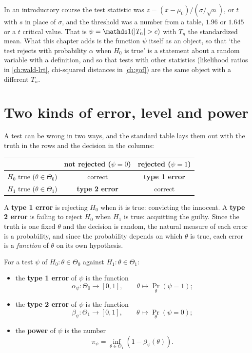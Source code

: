 \begin{bridge}
In an introductory course the test statistic was $z = (\bar{x} - \mu_0)/(\sigma/\sqrt{n})$, or $t$ with $s$ in place of $\sigma$, and the threshold was a number from a table, $1.96$ or $1.645$ or a $t$ critical value.
That is $\psi = \ind(\abs{T_n} > c)$ with $T_n$ the standardized mean.
What this chapter adds is the function $\psi$ itself as an object, so that `the test rejects with probability $\alpha$ when $H_0$ is true' is a statement about a random variable with a definition, and so that tests with other statistics (likelihood ratios in \cref{ch:wald-lrt}, chi-squared distances in \cref{ch:gof}) are the same object with a different $T_n$.
\end{bridge}

\section{Two kinds of error, level and power}
\label{sec:tests-errors}

A test can be wrong in two ways, and the standard table lays them out with the truth in the rows and the decision in the columns:
\begin{center}
\begin{tabular}{@{}lcc@{}}
\toprule
 & not rejected ($\psi = 0$) & rejected ($\psi = 1$) \\
\midrule
$H_0$ true ($\theta \in \Theta_0$) & correct & \textbf{type 1 error} \\
$H_1$ true ($\theta \in \Theta_1$) & \textbf{type 2 error} & correct \\
\bottomrule
\end{tabular}
\end{center}
A \textbf{type 1 error} is rejecting $H_0$ when it is true: convicting the innocent.
A \textbf{type 2 error} is failing to reject $H_0$ when $H_1$ is true: acquitting the guilty.
Since the truth is one fixed $\theta$ and the decision is random, the natural measure of each error is a probability, and since the probability depends on which $\theta$ is true, each error is a \textit{function} of $\theta$ on its own hypothesis.

\begin{definition}
\label{def:errors}
For a test $\psi$ of $H_0: \theta \in \Theta_0$ against $H_1: \theta \in \Theta_1$:
\begin{itemize}[nosep]
\item the \textbf{type 1 error} of $\psi$ is the function
\[
\alpha_\psi: \Theta_0 \to [0, 1], \qquad \theta \mapsto \Pr_\theta(\psi = 1);
\]
\item the \textbf{type 2 error} of $\psi$ is the function
\[
\beta_\psi: \Theta_1 \to [0, 1], \qquad \theta \mapsto \Pr_\theta(\psi = 0);
\]
\item the \textbf{power} of $\psi$ is the number 
\[
\pi_\psi = \inf_{\theta \in \Theta_1} \left( 1 - \beta_\psi(\theta) \right).
\]
\end{itemize}
\end{definition}

